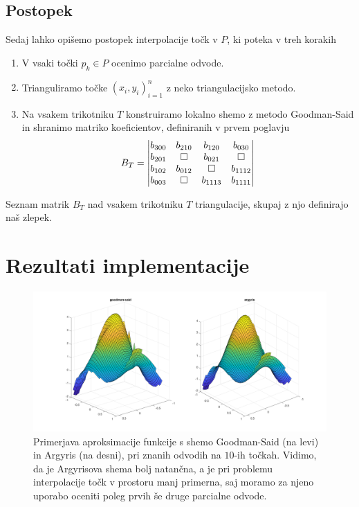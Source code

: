\documentclass[ letterpaper, titlepage, fleqn]{article}
\newcommand{\openbox}{\leavevmode
  \hbox to.77778em{%
  \hfil\vrule
  \vbox to.675em{\hrule width.6em\vfil\hrule}%
  \vrule\hfil}}
\begin{document}
{\subsection{Postopek}
Sedaj lahko opišemo postopek interpolacije točk v $P$, ki poteka v treh korakih
\begin{enumerate}
\item V vsaki točki $p_k \in P$ ocenimo parcialne odvode.
\item Trianguliramo točke $(x_i,y_i)_{i=1}^n$ z neko triangulacijsko metodo.
\item Na vsakem trikotniku $T$ konstruiramo lokalno shemo z metodo Goodman-Said in shranimo matriko 
koeficientov, definiranih v prvem poglavju
\begin{equation*}
B_T = 
\begin{vmatrix}
b_{300} & b_{210} & b_{120} & b_{030} \\
b_{201} & \openbox & b_{021} & \openbox  \\
b_{102} & b_{012} & \openbox & b_{1112} \\
b_{003} & \openbox & b_{1113} & b_{1111}
\end{vmatrix}
\end{equation*}
\end{enumerate}
Seznam  matrik $B_T$ nad vsakem trikotniku $T$ triangulacije, skupaj z njo
definirajo naš zlepek.

\section{Rezultati implementacije}

\begin{figure}[h]
\includegraphics[width=\textwidth]{slike/goodmansaid-vs-argyris.png}
\caption{ 
Primerjava aproksimacije funkcije s shemo Goodman-Said (na levi) in Argyris (na desni),
pri znanih odvodih na $10$-ih točkah. Vidimo, da je Argyrisova shema bolj natančna,
a je pri problemu interpolacije točk v prostoru manj primerna, 
saj moramo za njeno uporabo oceniti poleg prvih še druge parcialne odvode.
}
\end{figure}

}
\end{document}
